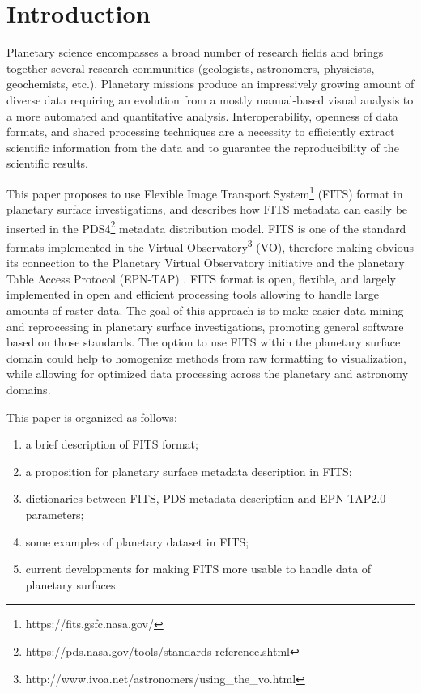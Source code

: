 %
%

\section{Introduction}
\label{sec:intro}
Planetary science encompasses a broad number of research fields and
brings together several research communities (geologists, astronomers,
physicists, geochemists, etc.). Planetary missions produce an impressively growing 
amount of diverse data requiring an evolution from a mostly manual-based visual 
analysis to a more automated and quantitative analysis.
Interoperability, openness of data formats, and shared processing techniques are 
a necessity to efficiently extract scientific information from the data and 
to guarantee the reproducibility of the scientific results.

This paper proposes to use Flexible Image Transport
System\footnote{https://fits.gsfc.nasa.gov/}
(FITS) format \citep{fitsorig,fitsver3} in planetary surface investigations,
and describes how FITS metadata can easily be inserted in the
PDS4\footnote{https://pds.nasa.gov/tools/standards-reference.shtml}
metadata distribution model.
FITS is one of the standard formats implemented in the Virtual
Observatory\footnote{http://www.ivoa.net/astronomers/using\_the\_vo.html}
(VO), therefore making obvious its connection to the Planetary Virtual
Observatory initiative and the planetary Table Access Protocol (EPN-TAP)
\citep{ERARDepntap}.
FITS format is open, flexible, and largely implemented in open and efficient
processing tools allowing to handle large amounts of raster data.
The goal of this approach is to make easier data mining and reprocessing
in planetary surface investigations, promoting general software based on those
standards.
The option to use FITS within the planetary surface domain could help to
homogenize methods from raw formatting to visualization, while
allowing for optimized data processing across the planetary and astronomy domains.

This paper is organized as follows:
\begin{enumerate}
\item{a brief description of FITS format;}
\item{a proposition for planetary surface metadata description in FITS;}
\item{dictionaries between FITS, PDS metadata description and EPN-TAP2.0
parameters;}
\item{some examples of planetary dataset in FITS;}
\item{current developments for making FITS more usable to handle data
of planetary surfaces.}
\end{enumerate}

